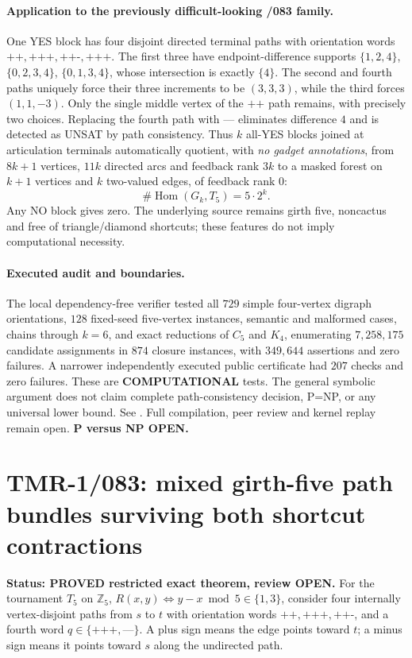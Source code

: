 \documentclass[11pt]{article}
\begin{document}
\paragraph{Application to the previously difficult-looking /083 family.}
One YES block has four disjoint directed terminal paths with
orientation words $\texttt{++},\texttt{+++},\texttt{++-},\texttt{+++}$.
The first three have endpoint-difference supports
$\{1,2,4\}$, $\{0,2,3,4\}$, $\{0,1,3,4\}$,
whose intersection is exactly $\{4\}$.
The second and fourth paths uniquely force their three
increments to be $(3,3,3)$, while the third forces
$(1,1,-3)$. Only the single middle vertex of the
$\texttt{++}$ path remains, with precisely two choices.
Replacing the fourth path with $\texttt{---}$ eliminates
difference $4$ and is detected as UNSAT by path consistency.
Thus $k$ all-YES blocks joined at articulation terminals
automatically quotient, with \emph{no gadget annotations},
from $8k+1$ vertices, $11k$ directed arcs and feedback
rank $3k$ to a masked forest on $k+1$ vertices and
$k$ two-valued edges, of feedback rank $0$:
\[
 \#\operatorname{Hom}(G_k,T_5)=5\cdot 2^k.
\]
Any NO block gives zero. The underlying source remains
girth five, noncactus and free of triangle/diamond shortcuts;
these features do not imply computational necessity.

\paragraph{Executed audit and boundaries.}
The local dependency-free verifier tested all $729$ simple
four-vertex digraph orientations, $128$ fixed-seed
five-vertex instances, semantic and malformed cases,
chains through $k=6$, and exact reductions of $C_5$
and $K_4$, enumerating $7{,}258{,}175$ candidate
assignments in $874$ closure instances, with $349{,}644$
assertions and zero failures. A narrower independently
executed public certificate had $207$ checks and
zero failures. These are \textbf{COMPUTATIONAL} tests.
The general symbolic argument does not claim complete
path-consistency decision, P=NP, or any universal lower bound.
See
.
Full compilation, peer review and kernel replay remain open.
\textbf{P versus NP OPEN.}


\section{TMR-1/083: mixed girth-five path bundles surviving both shortcut contractions}
\noindent\textbf{Status: PROVED restricted exact theorem, review OPEN.}
For the tournament $T_5$ on $\mathbb Z_5$,
$R(x,y)\iff y-x\bmod5\in\{1,3\}$, consider four
internally vertex-disjoint paths from $s$ to $t$ with
orientation words $\texttt{++},\texttt{+++},\texttt{++-}$,
and a fourth word $q\in\{\texttt{+++},\texttt{---}\}$.
A plus sign means the edge points toward $t$; a minus sign
means it points toward $s$ along the undirected path.
\end{document}
